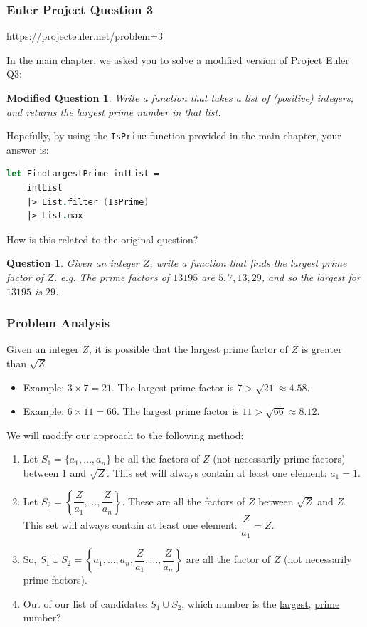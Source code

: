 \documentclass[12pt]{article}
\newtheorem*{question*}{Question}
\newtheorem*{modQuestion*}{Modified Question}
\begin{document}
\subsubsection{Euler Project Question 3}

\url{https://projecteuler.net/problem=3}

In the main chapter, we asked you to solve a modified version of Project Euler Q3:
\begin{modQuestion*}
Write a function that takes a list of (positive) integers, and returns the largest prime number in that list.
\end{modQuestion*}
Hopefully, by using the \texttt{IsPrime} function provided in the main chapter, your answer is:
\begin{lstlisting}[language=FSharp]
let FindLargestPrime intList =
    intList
    |> List.filter (IsPrime)
    |> List.max
\end{lstlisting}

How is this related to the original question?
\begin{question*}
Given an integer $Z$, write a function that finds the largest prime factor of $Z$. e.g. The prime factors of $13195$ are $5, 7, 13, 29$, and so the largest for $13195$ is $29$.
\end{question*}

\subsubsection*{Problem Analysis}
Given an integer $Z$, it is possible that the largest prime factor of $Z$ is greater than $\sqrt{Z}$
\begin{itemize}
\item Example: $3 \times 7 = 21$. The largest prime factor is $7 > \sqrt{21} \approx 4.58$.

\item Example: $6 \times 11 = 66$. The largest prime factor is $11 > \sqrt{66} \approx 8.12$.
\end{itemize}
We will modify our approach to the following method:
\begin{enumerate}
\item Let $S_1 = \{a_1, \ldots, a_n\}$ be all the factors of $Z$ (not necessarily prime factors) between $1$ and $\sqrt{Z}$. This set will always contain at least one element: $a_1 = 1$.
\item Let $S_2 = \left\{\dfrac{Z}{a_1},\ldots, \dfrac{Z}{a_n}\right\}$. These are all the factors of $Z$ between $\sqrt{Z}$ and $Z$. This set will always contain at least one element: $\dfrac{Z}{a_1} = Z$.
\item So, $S_1 \cup S_2 =  \left\{a_1, \ldots, a_n, \dfrac{Z}{a_1},\ldots, \dfrac{Z}{a_n}\right\}$ are all the factor of $Z$ (not necessarily prime factors).
\item Out of our list of candidates $S_1 \cup S_2$, which number is the \underline{largest}, \underline{prime} number?
\end{enumerate}
\end{document}
